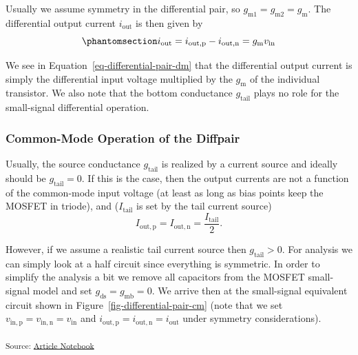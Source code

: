 \documentclass[
  a4paper,
  DIV=11,
  numbers=noendperiod]{scrartcl}
\begin{document}
Usually we assume symmetry in the differential pair, so
\(g_\mathrm{m1} = g_\mathrm{m2} = g_\mathrm{m}\). The differential
output current \(i_\mathrm{out}\) is then given by
\begin{equation}\phantomsection\label{eq-differential-pair-dm}{
i_\mathrm{out} = i_\mathrm{out,p} - i_\mathrm{out,n} = g_\mathrm{m}v_\mathrm{in}
}\end{equation}

We see in Equation~\ref{eq-differential-pair-dm} that the differential
output current is simply the differential input voltage multiplied by
the \(g_\mathrm{m}\) of the individual transistor. We also note that the
bottom conductance \(g_\mathrm{tail}\) plays no role for the
small-signal differential operation.

\subsubsection{Common-Mode Operation of the
Diffpair}\label{common-mode-operation-of-the-diffpair}

Usually, the source conductance \(g_\mathrm{tail}\) is realized by a
current source and ideally should be \(g_\mathrm{tail} = 0\). If this is
the case, then the output currents are not a function of the common-mode
input voltage (at least as long as bias points keep the MOSFET in
triode), and (\(I_\mathrm{tail}\) is set by the tail current source) \[
I_\mathrm{out,p} = I_\mathrm{out,n} = \frac{I_\mathrm{tail}}{2}.
\]

However, if we assume a realistic tail current source then
\(g_\mathrm{tail} > 0\). For analysis we can simply look at a half
circuit since everything is symmetric. In order to simplify the analysis
a bit we remove all capacitors from the MOSFET small-signal model and
set \(g_\mathrm{ds}= g_\mathrm{mb}= 0\). We arrive then at the
small-signal equivalent circuit shown in
Figure~\ref{fig-differential-pair-cm} (note that we set
\(v_\mathrm{in,p} = v_\mathrm{in,n} = v_\mathrm{in}\) and
\(i_\mathrm{out,p} = i_\mathrm{out,n} = i_\mathrm{out}\) under symmetry
considerations).

\textsubscript{Source:
\href{https://iic-jku.github.io/analog-circuit-design/index.qmd.html}{Article
Notebook}}
\end{document}
